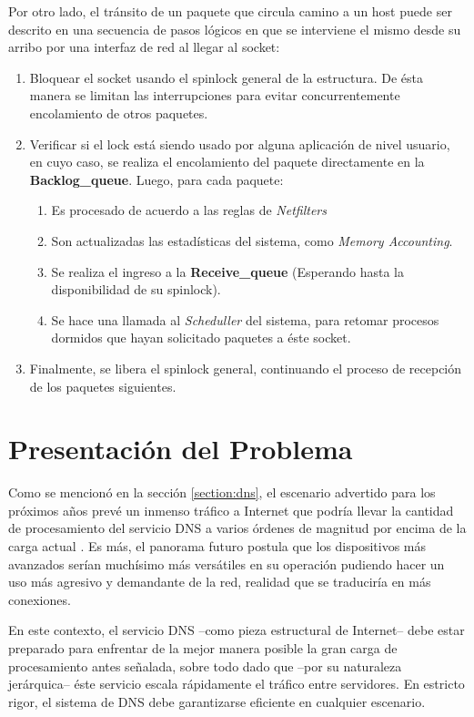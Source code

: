 Por otro lado, el tránsito de un paquete que circula camino a un host puede ser descrito en una secuencia de pasos lógicos en que se interviene el mismo desde su arribo por una interfaz de red al llegar al socket:
\begin{enumerate}
\item Bloquear el socket usando el spinlock general de la estructura. De ésta manera se limitan las interrupciones para evitar concurrentemente encolamiento de otros paquetes.
\item Verificar si el lock está siendo usado por alguna aplicación de nivel usuario, en cuyo caso, se realiza el encolamiento del paquete directamente en la \textbf{Backlog\_queue}. Luego, para cada paquete:
	\begin{enumerate}
	\item Es procesado de acuerdo a las reglas de \emph{Netfilters}
	\item Son actualizadas las estadísticas del sistema, como \emph{Memory Accounting}.
	\item Se realiza el ingreso a la \textbf{Receive\_queue} (Esperando hasta la disponibilidad de su spinlock).
	\item Se hace una llamada al \emph{Scheduller} del sistema, para retomar procesos dormidos que hayan solicitado paquetes a éste socket.
	\end{enumerate}
\item Finalmente, se libera el spinlock general, continuando el proceso de recepción de los paquetes siguientes.
\end{enumerate}

\section{Presentación del Problema}
Como se mencionó en la sección \ref{section:dns}, el escenario advertido para los próximos años prevé un inmenso tráfico a Internet que podría llevar la cantidad de procesamiento del servicio DNS a varios órdenes de magnitud por encima de la carga actual \cite{slides:dnsRootQueries, paper:dnsRootQueries}. Es más, el panorama futuro postula que los dispositivos más avanzados serían muchísimo más versátiles en su operación pudiendo hacer un uso más agresivo y demandante de la red, realidad que se traduciría en más conexiones.

En este contexto, el servicio DNS --como pieza estructural de Internet-- debe estar preparado para enfrentar de la mejor manera posible la gran carga de procesamiento antes señalada, sobre todo dado que --por su naturaleza jerárquica-- éste servicio escala rápidamente el tráfico entre servidores. En estricto rigor, el sistema de DNS debe garantizarse eficiente en cualquier escenario.

